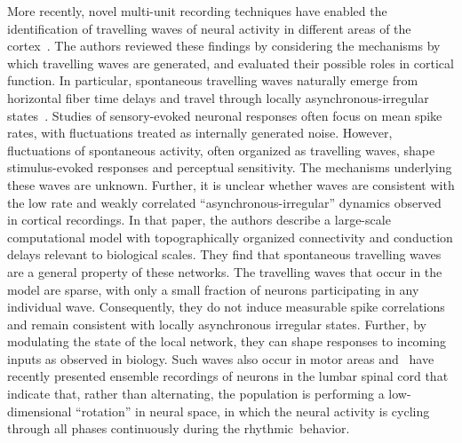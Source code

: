 \documentclass[brainsci, %
               review,accept,pdftex,moreauthors
               ]{Definitions/mdpi}
\begin{document}
More recently, novel multi-unit recording techniques have enabled the identification of travelling waves of neural activity in different areas of the cortex~\citep{muller_cortical_2018}. The authors reviewed these findings by considering the mechanisms by which travelling waves are generated, and evaluated their possible roles in cortical function. In particular, spontaneous travelling waves naturally emerge from horizontal fiber time delays and travel through locally asynchronous-irregular states~\citep{davis_spontaneous_2021}. Studies of sensory-evoked neuronal responses often focus on mean spike rates, with fluctuations treated as internally generated noise. However, fluctuations of spontaneous activity, often organized as travelling waves, shape stimulus-evoked responses and perceptual sensitivity. The mechanisms underlying these waves are unknown. Further, it is unclear whether waves are consistent with the low rate and weakly correlated ``asynchronous-irregular'' dynamics observed in cortical recordings. In that paper, the authors describe a large-scale computational model with topographically organized connectivity and conduction delays relevant to biological scales. They find that spontaneous travelling waves are a general property of these networks. The travelling waves that occur in the model are sparse, with only a small fraction of neurons participating in any individual wave. Consequently, they do not induce measurable spike correlations and remain consistent with locally asynchronous irregular states. Further, by modulating the state of the local network, they can shape responses to incoming inputs as observed in biology. Such waves also occur in motor areas and~\citet{linden_movement_2022} have recently presented ensemble recordings of neurons in the lumbar spinal cord that indicate that, rather than alternating, the population is performing a low-dimensional ``rotation'' in neural space, in which the neural activity is cycling through all phases continuously during the rhythmic~behavior.
\end{document}

